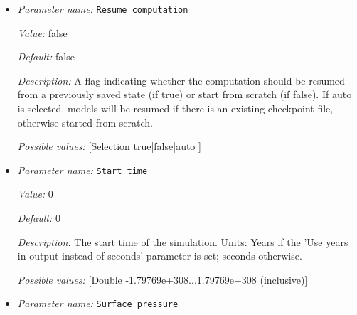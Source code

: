 \begin{itemize}
{\it Value:} surface


{\it Default:} surface


{\it Description:} If and how to normalize the pressure after the solution step. This is necessary because depending on boundary conditions, in many cases the pressure is only determined by the model up to a constant. On the other hand, we often would like to have a well-determined pressure, for example for table lookups of material properties in models or for comparing solutions. If the given value is `surface', then normalization at the end of each time steps adds a constant value to the pressure in such a way that the average pressure at the surface of the domain is zero; the surface of the domain is determined by asking the geometry model whether a particular face of the geometry has a zero or small `depth'. If the value of this parameter is `volume' then the pressure is normalized so that the domain average is zero. If `no' is given, the no pressure normalization is performed.


{\it Possible values:} [Selection surface|volume|no ]
\item {\it Parameter name:} {\tt Resume computation}
\label{parameters:Resume computation}


{\it Value:} false


{\it Default:} false


{\it Description:} A flag indicating whether the computation should be resumed from a previously saved state (if true) or start from scratch (if false). If auto is selected, models will be resumed if there is an existing checkpoint file, otherwise started from scratch.


{\it Possible values:} [Selection true|false|auto ]
\item {\it Parameter name:} {\tt Start time}
\label{parameters:Start time}


{\it Value:} 0


{\it Default:} 0


{\it Description:} The start time of the simulation. Units: Years if the 'Use years in output instead of seconds' parameter is set; seconds otherwise.


{\it Possible values:} [Double -1.79769e+308...1.79769e+308 (inclusive)]
\item {\it Parameter name:} {\tt Surface pressure}
\label{parameters:Surface pressure}



\end{itemize}
